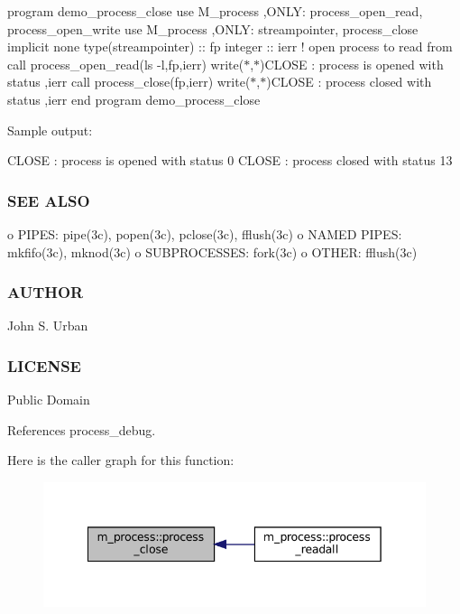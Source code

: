program demo\+\_\+process\+\_\+close use M\+\_\+process ,O\+N\+LY\+: process\+\_\+open\+\_\+read, process\+\_\+open\+\_\+write use M\+\_\+process ,O\+N\+LY\+: streampointer, process\+\_\+close implicit none type(streampointer) \+:\+: fp integer \+:\+: ierr ! open process to read from call process\+\_\+open\+\_\+read(\textquotesingle{}ls -\/l\textquotesingle{},fp,ierr) write($\ast$,$\ast$)\textquotesingle{}C\+L\+O\+SE \+: process is opened with status \textquotesingle{},ierr call process\+\_\+close(fp,ierr) write($\ast$,$\ast$)\textquotesingle{}C\+L\+O\+SE \+: process closed with status \textquotesingle{},ierr end program demo\+\_\+process\+\_\+close

Sample output\+:

C\+L\+O\+SE \+: process is opened with status 0 C\+L\+O\+SE \+: process closed with status 13

\subsubsection*{S\+EE A\+L\+SO}

o P\+I\+P\+ES\+: pipe(3c), popen(3c), pclose(3c), fflush(3c) o N\+A\+M\+ED P\+I\+P\+ES\+: mkfifo(3c), mknod(3c) o S\+U\+B\+P\+R\+O\+C\+E\+S\+S\+ES\+: fork(3c) o O\+T\+H\+ER\+: fflush(3c) \subsubsection*{A\+U\+T\+H\+OR}

John S. Urban \subsubsection*{L\+I\+C\+E\+N\+SE}

Public Domain 

References process\+\_\+debug.

Here is the caller graph for this function\+:\nopagebreak
\begin{figure}[H]
\begin{center}
\leavevmode
\includegraphics[width=342pt]{namespacem__process_ab4c5cad3fb46686f0c9b71c3a634f6ae_icgraph}
\end{center}
\end{figure}
\mbox{\label{namespacem__process_a3c0f543a9ceff2671041d73660f60a59}} 
